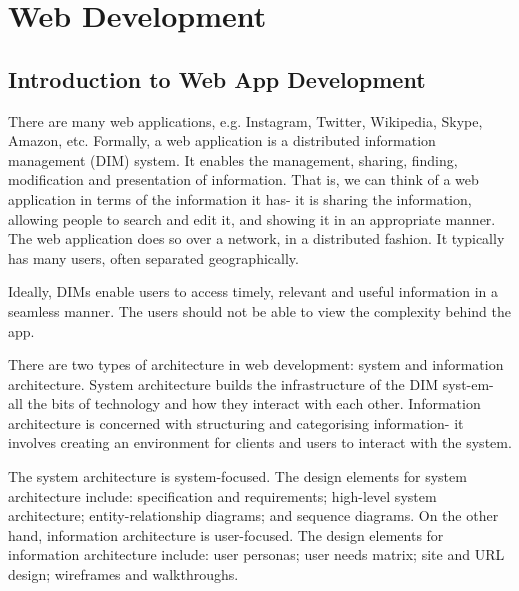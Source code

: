 \documentclass[a4paper, openany]{memoir}
\begin{document}
    \chapter{Web Development}

    \section{Introduction to Web App Development}
    There are many web applications, e.g. Instagram, Twitter, Wikipedia, Skype, Amazon, etc. Formally, a web application is a distributed information management (DIM) system. It enables the management, sharing, finding, modification and presentation of information. That is, we can think of a web application in terms of the information it has- it is sharing the information, allowing people to search and edit it, and showing it in an appropriate manner. The web application does so over a network, in a distributed fashion. It typically has many users, often separated geographically.

    Ideally, DIMs enable users to access timely, relevant and useful information in a seamless manner. The users should not be able to view the complexity behind the app.

    There are two types of architecture in web development: system and information architecture. System architecture builds the infrastructure of the DIM syst-em- all the bits of technology and how they interact with each other. Information architecture is concerned with structuring and categorising information- it involves creating an environment for clients and users to interact with the system.

    The system architecture is system-focused. The design elements for system architecture include: specification and requirements; high-level system architecture; entity-relationship diagrams; and sequence diagrams. On the other hand, information architecture is user-focused. The design elements for information architecture include: user personas; user needs matrix; site and URL design; wireframes and walkthroughs.
\end{document}
